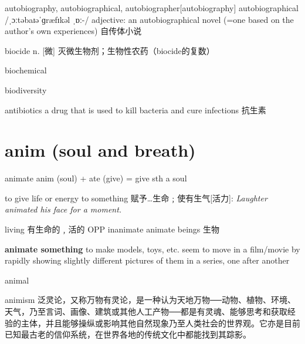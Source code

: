 \begin{DefWord}{autobiography, autobiographical, autobiographer}[autobiography]
    autobiographical /ˌɔːtəbaɪəˈɡræfɪkəl ˌɒː-/ adjective:
    an autobiographical novel (=one based on the author’s own experiences) 自传体小说
\end{DefWord}

\begin{DefWord}{biocide}
    n. [微] 灭微生物剂；生物性农药（biocide的复数）
\end{DefWord}

\begin{DefWord}{biochemical}
\end{DefWord}

\begin{DefWord}{biodiversity}
\end{DefWord}

\begin{DefWord}{antibiotics}
    a drug that is used to kill bacteria and cure infections 抗生素
\end{DefWord}

\section{anim (soul and breath)}

\begin{DefWord}{animate}
    anim (soul) + ate (give) = give sth a soul

    to give life or energy to something 赋予…生命﹔使有生气[活力]:
    \textit{Laughter animated his face for a moment.}

    living 有生命的﹐活的 OPP  inanimate
    animate beings 生物 

    \textbf{animate something} to make models, toys, etc. seem to move in a film/movie by rapidly showing slightly different pictures of them in a series, one after another
\end{DefWord}

\begin{DefWord}{animal}
\end{DefWord}

\begin{DefWord}{animism}
    泛灵论，又称万物有灵论，是一种认为天地万物──动物、植物、环境、天气，乃至言词、画像、建筑或其他人工产物──都是有灵魂、能够思考和获取经验的主体，并且能够操纵或影响其他自然现象乃至人类社会的世界观。它亦是目前已知最古老的信仰系统，在世界各地的传统文化中都能找到其踪影。
\end{DefWord}


